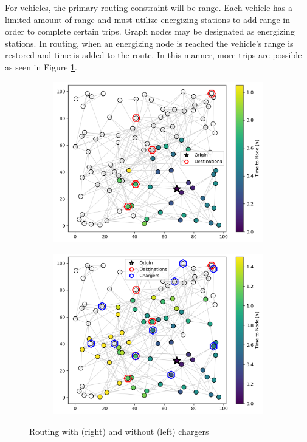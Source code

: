 For vehicles, the primary routing constraint will be range. Each vehicle has a limited amount of range and must utilize energizing stations to add range in order to complete certain trips. Graph nodes may be designated as energizing stations. In routing, when an energizing node is reached the vehicle's range is restored and time is added to the route. In this manner, more trips are possible as seen in Figure \ref{fig:routing_chargers}.

\begin{figure}[H]
	\centering
	\begin{subfigure}{.5\linewidth}
		\centering\includegraphics[width = \linewidth]{figs/routing_without_chargers.png}
	\end{subfigure}%
	\begin{subfigure}{.5\linewidth}
		\centering\includegraphics[width = \linewidth]{figs/routing_with_chargers.png}
	\end{subfigure}
	\caption{Routing with (right) and without (left) chargers}
	\label{fig:routing_chargers}
\end{figure}